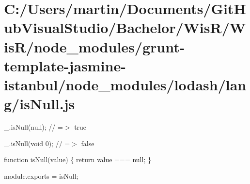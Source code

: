 \hypertarget{_c_1_2_users_2martin_2_documents_2_git_hub_visual_studio_2_bachelor_2_wis_r_2_wis_r_2node_module92fabaf35293e30fed7a4ffe0f98aa23}{}\section{C\+:/\+Users/martin/\+Documents/\+Git\+Hub\+Visual\+Studio/\+Bachelor/\+Wis\+R/\+Wis\+R/node\+\_\+modules/grunt-\/template-\/jasmine-\/istanbul/node\+\_\+modules/lodash/lang/is\+Null.\+js}
\+\_\+.\+is\+Null(null); // =$>$ true

\+\_\+.\+is\+Null(void 0); // =$>$ false


\begin{DoxyCodeInclude}

\textcolor{keyword}{function} isNull(value) \{
  \textcolor{keywordflow}{return} value === null;
\}

module.exports = isNull;
\end{DoxyCodeInclude}
 